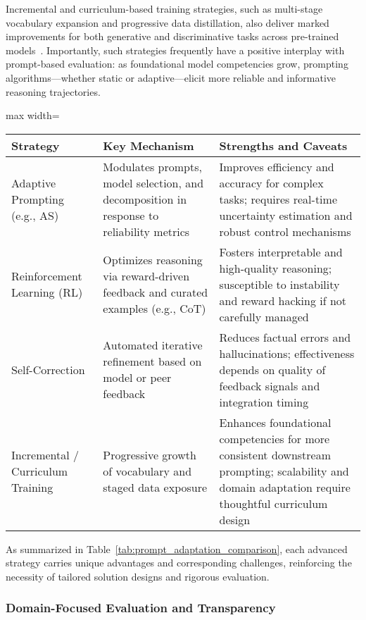 \documentclass[sigconf]{acmart}
\begin{document}
Incremental and curriculum-based training strategies, such as multi-stage vocabulary expansion and progressive data distillation, also deliver marked improvements for both generative and discriminative tasks across pre-trained models~\cite{ref49,ref103}. Importantly, such strategies frequently have a positive interplay with prompt-based evaluation: as foundational model competencies grow, prompting algorithms---whether static or adaptive---elicit more reliable and informative reasoning trajectories.

\begin{table*}[htbp]
\centering
\caption{Comparison of Advanced Prompting and Adaptation Strategies}
\label{tab:prompt_adaptation_comparison}
\begin{adjustbox}{max width=\textwidth}
\begin{tabular}{lll}
\toprule
\textbf{Strategy} & \textbf{Key Mechanism} & \textbf{Strengths and Caveats} \\
\midrule
Adaptive Prompting (e.g., AS) & Modulates prompts, model selection, and decomposition in response to reliability metrics & Improves efficiency and accuracy for complex tasks; requires real-time uncertainty estimation and robust control mechanisms \\
Reinforcement Learning (RL) & Optimizes reasoning via reward-driven feedback and curated examples (e.g., CoT) & Fosters interpretable and high-quality reasoning; susceptible to instability and reward hacking if not carefully managed \\
Self-Correction & Automated iterative refinement based on model or peer feedback & Reduces factual errors and hallucinations; effectiveness depends on quality of feedback signals and integration timing \\
Incremental / Curriculum Training & Progressive growth of vocabulary and staged data exposure & Enhances foundational competencies for more consistent downstream prompting; scalability and domain adaptation require thoughtful curriculum design \\
\bottomrule
\end{tabular}
\end{adjustbox}
\end{table*}

As summarized in Table~\ref{tab:prompt_adaptation_comparison}, each advanced strategy carries unique advantages and corresponding challenges, reinforcing the necessity of tailored solution designs and rigorous evaluation.

\subsubsection{Domain-Focused Evaluation and Transparency}
\end{document}
